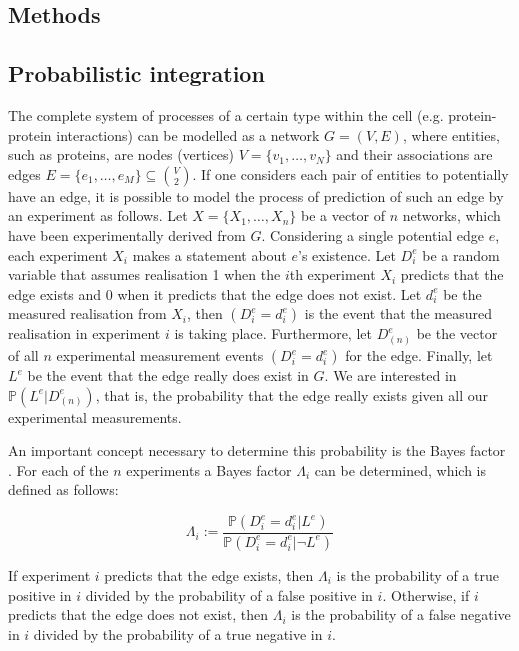 \documentclass{bioinfo}
\newcommand{\prob}{\mathbb{P}}
\begin{document}
\begin{methods}
\section{Methods}

\subsection{Probabilistic integration}

The complete system of processes of a certain type within the cell (e.g. protein-protein interactions) can be modelled as a network $G=(V,E)$, where entities, such as proteins, are nodes (vertices) $V=\{v_1,\ldots,v_N\}$ and their associations are edges $E = \{e_1, \ldots,e_M\} \subseteq \binom{V}{2}$. If one considers each pair of entities to potentially have an edge, it is possible to model the process of prediction of such an edge by an experiment as follows. Let $X = \{X_1, \ldots, X_n \}$ be a vector of $n$ networks, which have been experimentally derived from $G$. Considering a single potential edge $e$, each experiment $X_i$ makes a statement about $e$'s existence. Let $D^e_i$ be a random variable that assumes realisation 1 when the $i$th experiment $X_i$ predicts that the edge exists and 0 when it predicts that the edge does not exist. Let $d^e_i$ be the measured realisation from $X_i$, then $(D^e_i=d^e_i)$ is the event that the measured realisation in experiment $i$ is taking place. Furthermore, let $D^e_{(n)}$ be the vector of all $n$ experimental measurement events $(D^e_i=d^e_i)$ for the edge. Finally, let $L^e$ be the event that the edge really does exist in $G$. We are interested in $\prob(L^e|D^e_{(n)})$, that is, the probability that the edge really exists given all our experimental measurements.

An important concept necessary to determine this probability is the Bayes factor \citep{goodman_toward_1999}. For each of the $n$ experiments a Bayes factor $\Lambda_i$ can be determined, which is defined as follows:

\begin{equation} 
	 \Lambda_i := \frac{\prob(D^e_i=d^e_i|L^e)}{\prob(D^e_i=d^e_i|\neg L^e)} 
\end{equation}

If experiment $i$ predicts that the edge exists, then $\Lambda_i$ is the probability of a true positive in $i$ divided by the probability of a false positive in $i$. Otherwise, if $i$ predicts that the edge does not exist, then $\Lambda_i$ is the probability of a false negative in $i$ divided by the probability of a true negative in $i$.


\end{methods}
\end{document}
